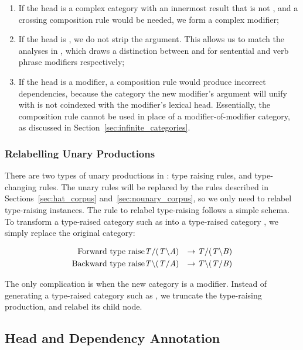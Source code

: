 \begin{enumerate}
 \item If the head is a complex category with an innermost result that is not
, and a crossing composition rule would be needed, we form a complex
modifier;
 \item If the head is , we do not strip the  argument. This
allows us to match the analyses in \ccgbank, which draws a distinction between
 and  for sentential and verb phrase modifiers
respectively;
 \item If the head is a modifier, a composition rule would produce incorrect
dependencies, because the category the new modifier's argument will unify with is
not coindexed with the modifier's lexical head. Essentially, the composition rule
cannot be used in place of a modifier-of-modifier category, as discussed in
Section~\ref{sec:infinite_categories}.
\end{enumerate}

\subsubsection{Relabelling Unary Productions}

There are two types of unary productions in \ccgbank: type raising rules, and
type-changing rules. The unary rules will be replaced by the
rules described in Sections~\ref{sec:hat_corpus} and~\ref{sec:nounary_corpus},
so we only need to relabel type-raising instances. The rule to relabel type-raising
follows a simple schema. To transform a type-raised category  such as 
into a type-raised category , we simply replace the original category:

\begin{eqnarray}
 \mbox{Forward  type raise} & \mbox{$\it{T/(T\backslash A)}$} & \to \mbox{$\it{T/(T\backslash B)}$}\\
 \mbox{Backward type raise} & \mbox{$\it{T\backslash(T/A)}$}  & \to \mbox{$\it{T\backslash(T/B)}$}
\end{eqnarray}

The only complication is when the new category is a modifier. Instead of generating a
type-raised category such as , we truncate the type-raising production,
and relabel its child node.


\subsection{Head and Dependency Annotation}
\label{mu_annotation}

